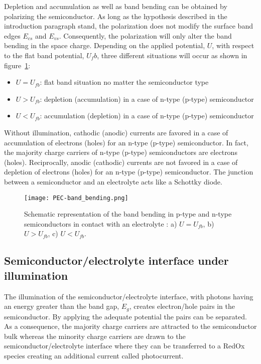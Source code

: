     Depletion and accumulation as well as band bending can be obtained 
    by polarizing the semiconductor. 
    As long as the hypothesis described in the introduction paragraph stand, 
    the polarization does not modify the surface band edges $E_{cs}$ and $E_{vs}$. 
    Consequently, the polarization will only alter the band bending in the space 
    charge. 
    Depending on the applied potential, $U$, with respect to the flat band 
    potential, $U_fb$, three different situations will occur as shown in 
    figure~\ref{fig_band_bending}:
    \begin{itemize}
    \item $U = U_{fb}$: flat band situation no matter the semiconductor type
    \item $U > U_{fb}$: depletion (accumulation) in a case of n-type (p-type) semiconductor  
    \item $U < U_{fb}$: accumulation (depletion) in a case of n-type (p-type) semiconductor
    \end{itemize}

    Without illumination, cathodic (anodic) currents are favored in a case of 
    accumulation of electrons (holes) for an n-type (p-type) semiconductor. 
    In fact, the majority charge carriers of n-type (p-type) semiconductors are 
    electrons (holes). 
    Reciprocally, anodic (cathodic) currents are not favored in a case of 
    depletion of electrons (holes) for an n-type (p-type) semiconductor. 
    The junction between a semiconductor and an electrolyte acts like a Schottky diode.

    \begin{figure}[H]
        \centering
            \texttt{[image: PEC-band\_bending.png]}
        \caption{Schematic representation of the band bending in p-type and n-type 
        semiconductors in contact with an electrolyte \citep{memming2008, bard2002}:
         a) $U = U_{fb}$, b) $U > U_{fb}$, c) $U < U_{fb}$.}
        \label{fig_band_bending}
    \end{figure}
    \clearpage


\subsection{Semiconductor/electrolyte interface under illumination}
    The illumination of the semiconductor/electrolyte interface, 
    with photons having an energy greater than the band gap, $E_g$, creates 
    electron/hole pairs in the semiconductor. 
    By applying the adequate potential the pairs can be separated. 
    As a consequence, the majority charge carriers are attracted to the 
    semiconductor bulk whereas the minority charge carriers are drawn to the 
    semiconductor/electrolyte interface where they can be transferred to a RedOx 
    species creating an additional current called photocurrent.  

